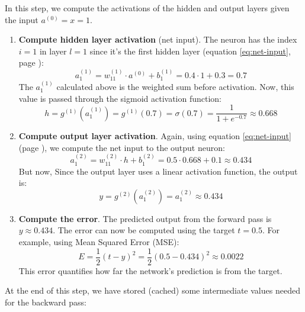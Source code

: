 \begin{examplebox}
    \highspace
     In this step, we compute the activations of the hidden and output layers given the input $a^{(0)} = x = 1$.
    \begin{enumerate}
        \item \textbf{Compute hidden layer activation} (net input). The neuron has the index $i=1$ in layer $l=1$ since it's the first hidden layer (equation \ref{eq:net-input}, page \pageref{eq:net-input}):
        \begin{equation*}
            a_{1}^{(1)} = w_{11}^{(1)} \cdot a^{(0)} + b_{1}^{(1)} = 0.4 \cdot 1 + 0.3 = 0.7
        \end{equation*}
        The $a_{1}^{(1)}$ calculated above is the weighted sum before activation. Now, this value is passed through the sigmoid activation function:
        \begin{equation*}
            h = g^{(1)}\left(a_{1}^{(1)}\right) = g^{(1)}\left(0.7\right) = \sigma(0.7) = \dfrac{1}{1 + e^{-0.7}} \approx 0.668
        \end{equation*}
        \item \textbf{Compute output layer activation}. Again, using equation \ref{eq:net-input} (page \pageref{eq:net-input}), we compute the net input to the output neuron:
        \begin{equation*}
            a_{1}^{(2)} = w_{11}^{(2)} \cdot h + b_{1}^{(2)} = 0.5 \cdot 0.668 + 0.1 \approx 0.434
        \end{equation*}
        But now, Since the output layer uses a linear activation function, the output is:
        \begin{equation*}
            y = g^{(2)}(a_{1}^{(2)}) = a_{1}^{(2)} \approx 0.434
        \end{equation*}
        \item \textbf{Compute the error}. The predicted output from the forward pass is $y \approx 0.434$. The error can now be computed using the target $t=0.5$. For example, using Mean Squared Error (MSE):
        \begin{equation*}
            E = \dfrac{1}{2} \left(t - y\right)^{2} = \dfrac{1}{2} \left(0.5 - 0.434\right)^{2} \approx 0.0022
        \end{equation*}
        This error quantifies how far the network's prediction is from the target.
    \end{enumerate}
    At the end of this step, we have stored (cached) some intermediate values needed for the backward pass:
    \begin{itemize}

\end{itemize}
\end{examplebox}
